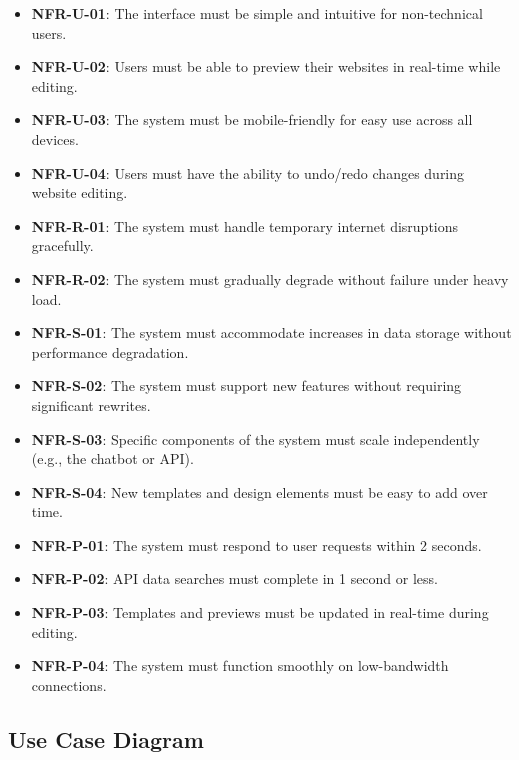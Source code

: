 \documentclass[12pt]{report}
\begin{document}
\begin{itemize}
    \item \textbf{NFR-U-01}: The interface must be simple and intuitive for non-technical users.
    \item \textbf{NFR-U-02}: Users must be able to preview their websites in real-time while editing.
    \item \textbf{NFR-U-03}: The system must be mobile-friendly for easy use across all devices.
    \item \textbf{NFR-U-04}: Users must have the ability to undo/redo changes during website editing.
    \item \textbf{NFR-R-01}: The system must handle temporary internet disruptions gracefully.
    \item \textbf{NFR-R-02}: The system must gradually degrade without failure under heavy load.
    \item \textbf{NFR-S-01}: The system must accommodate increases in data storage without performance degradation.
    \item \textbf{NFR-S-02}: The system must support new features without requiring significant rewrites.
    \item \textbf{NFR-S-03}: Specific components of the system must scale independently (e.g., the chatbot or API).
    \item \textbf{NFR-S-04}: New templates and design elements must be easy to add over time.
    \item \textbf{NFR-P-01}: The system must respond to user requests within 2 seconds.
    \item \textbf{NFR-P-02}: API data searches must complete in 1 second or less.
    \item \textbf{NFR-P-03}: Templates and previews must be updated in real-time during editing.
    \item \textbf{NFR-P-04}: The system must function smoothly on low-bandwidth connections.
\end{itemize}
\subsection{Use Case Diagram}
\end{document}
